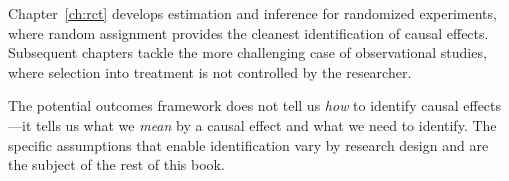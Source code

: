 Chapter~\ref{ch:rct} develops estimation and inference for randomized experiments, where random assignment provides the cleanest identification of causal effects. Subsequent chapters tackle the more challenging case of observational studies, where selection into treatment is not controlled by the researcher.

\begin{insight}
The potential outcomes framework does not tell us \emph{how} to identify causal effects---it tells us what we \emph{mean} by a causal effect and what we need to identify. The specific assumptions that enable identification vary by research design and are the subject of the rest of this book.
\end{insight}
